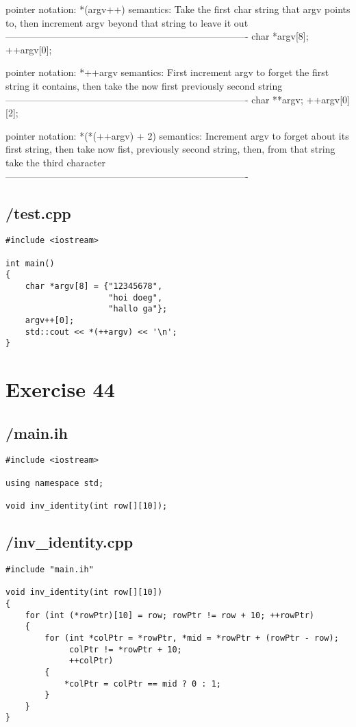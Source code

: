 \documentclass{article}
\begin{document}
pointer notation:  *(argv++)
       semantics:  Take the first char string that argv points to, then 
                   increment argv beyond that string to leave it out
----------------------------------------------------------------------------
  char *argv[8];      ++argv[0];

pointer notation:  *++argv
       semantics:  First increment argv to forget the first string it
                   contains, then take the now first previously second 
                   string
----------------------------------------------------------------------------
  char **argv;        ++argv[0][2];

pointer notation:  *(*(++argv) + 2)
       semantics:  Increment argv to forget about its first string, then 
                   take now fist, previously second string, then, from that
                   string take the third character 
----------------------------------------------------------------------------
\subsection*{/test.cpp}
\begin{verbatim}
#include <iostream>

int main()
{
    char *argv[8] = {"12345678", 
                     "hoi doeg",
                     "hallo ga"};
    argv++[0];
    std::cout << *(++argv) << '\n';
}
\end{verbatim}

\section*{Exercise 44}
\subsection*{/main.ih}
\begin{verbatim}
#include <iostream>

using namespace std;

void inv_identity(int row[][10]);

\end{verbatim}
\subsection*{/inv\_identity.cpp}
\begin{verbatim}
#include "main.ih"

void inv_identity(int row[][10])
{
    for (int (*rowPtr)[10] = row; rowPtr != row + 10; ++rowPtr)
    {
        for (int *colPtr = *rowPtr, *mid = *rowPtr + (rowPtr - row); 
             colPtr != *rowPtr + 10; 
             ++colPtr)
        {
            *colPtr = colPtr == mid ? 0 : 1;
        }
    }
}
\end{verbatim}
\end{document}
